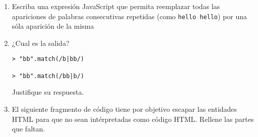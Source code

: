 \begin{enumerate}
\def\labelenumi{\arabic{enumi}.}
\setcounter{enumi}{4}
\item
  Escriba una expresión JavaScript que permita reemplazar todas las
  apariciones de palabras consecutivas repetidas (como
  \texttt{hello hello}) por una sóla aparición de la misma
\item
  ¿Cual es la salida?

\begin{verbatim}
> "bb".match(/b|bb/)

> "bb".match(/bb|b/)
\end{verbatim}

  Justifique su respuesta.
\item
  El siguiente fragmento de código tiene por objetivo escapar las
  entidades HTML para que no sean intérpretadas como código HTML.
  Rellene las partes que faltan.
\end{enumerate}

\begin{Shaded}
\begin{Highlighting}[]
 
    \NormalTok{: }\NormalTok{,}
    \NormalTok{: }\NormalTok{,}
    \NormalTok{: }\NormalTok{,}
    \NormalTok{: }\NormalTok{,}
    \NormalTok{: }\NormalTok{,}
    \NormalTok{: }
  \NormalTok{\};}

 
   \NormalTok{(}\NormalTok{, } 
     \NormalTok{____________;}
  \NormalTok{\});}
\end{Highlighting}
\end{Shaded}

